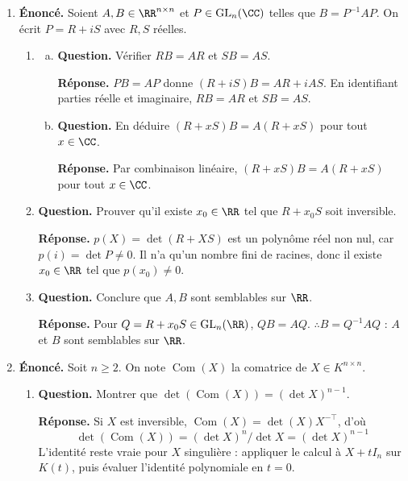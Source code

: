 \documentclass[12pt, a4paper]{article}
\begin{document}
\begin{enumerate}[label=5.\arabic*., start=54]
\begin{minipage}[t]{\linewidth}
\begin{enumerate}[\arabic*.]
\end{enumerate}
\end{minipage}

  \item \begin{minipage}[t]{\linewidth}\raggedright
\textbf{Énoncé.} Soient $A,B\in\RR^{n\times n}$ et $P\in\operatorname{GL}_n(\CC)$ telles que $B=P^{-1}AP$. On écrit $P=R+iS$ avec $R,S$ réelles.

\begin{enumerate}[\arabic*.]
        \item \begin{enumerate}[a.]
            \item \textbf{Question.} Vérifier $RB=AR$ et $SB=AS$.
\par\smallskip
\textbf{Réponse.} $PB=AP$ donne $(R+iS)B=AR+iAS$.
            En identifiant parties réelle et imaginaire, $RB=AR$ et $SB=AS$.

  \item \textbf{Question.} En déduire $(R+xS)B=A(R+xS)$ pour tout $x\in\CC$.
\par\smallskip
\textbf{Réponse.} Par combinaison linéaire, $(R+xS)B=A(R+xS)$ pour tout $x\in\CC$.

\end{enumerate}

  \item \textbf{Question.} Prouver qu’il existe $x_0\in\RR$ tel que $R+x_0S$ soit inversible.
\par\smallskip
\textbf{Réponse.} $p(X)=\det(R+XS)$ est un polynôme réel non nul, car $p(i)=\det P\neq0$.
        Il n'a qu'un nombre fini de racines, donc il existe $x_0\in\RR$ tel que $p(x_0)\neq0$.

  \item \textbf{Question.} Conclure que $A,B$ sont semblables sur $\RR$.
\par\smallskip
\textbf{Réponse.} Pour $Q=R+x_0S\in\operatorname{GL}_n(\RR)$, $QB=AQ$.
        $\therefore B=Q^{-1}AQ$ : $A$ et $B$ sont semblables sur $\RR$.

\end{enumerate}
\end{minipage}

  \item \begin{minipage}[t]{\linewidth}\raggedright
\textbf{Énoncé.} Soit $n\geq2$. On note $\operatorname{Com}(X)$ la comatrice de $X\in K^{n\times n}$.

\begin{enumerate}[\arabic*.]
        \item \textbf{Question.} Montrer que $\det(\operatorname{Com}(X))=(\det X)^{n-1}$.
\par\smallskip
\textbf{Réponse.} Si $X$ est inversible, $\operatorname{Com}(X)=\det(X)X^{-\top}$, d'où
        \[
          \det(\operatorname{Com}(X))=(\det X)^n/\det X=(\det X)^{n-1}
        \]
        L'identité reste vraie pour $X$ singulière : appliquer le calcul à $X+tI_n$ sur $K(t)$, puis évaluer l'identité polynomiale en $t=0$.


\end{enumerate}
\end{minipage}
\end{enumerate}
\end{document}
